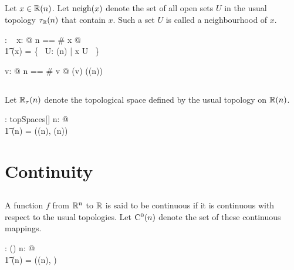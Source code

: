 \documentclass[11pt, oneside]{article}
\begin{document}
\subsection{}

Let $x \in \mathbb{R}(n)$. 
Let $\operatorname{neigh}(x)$ denote the set of all open sets $U$ in the usual topology $\tau_{\mathbb{R}}(n)$ that contain $x$.
Such a set $U$ is called a neighbourhood of $x$.

\begin{axdef}
	\neighRn: \Rinf \fun \family~\Rinf
\where
	\forall x: \Rinf @ \LET n == \# x @\\
	\t1	\neighRn(x) = \{~ U: \tauRn(n) | x \in U ~\}
\end{axdef}

\begin{remark}

\begin{zed}
	\forall v: \Rinf @ \LET n == \# v @ \neighRn(v) \in \family(\Rtuples(n))
\end{zed}

\end{remark}

\subsection{}

Let $\mathbb{R}_\tau(n)$ denote the topological space defined by the usual topology on $\mathbb{R}(n)$.

\begin{axdef}
	\RtauN: \nat \fun topSpaces[\Rinf]
\where
	\forall n: \nat @ \\
	\t1	\RtauN(n) = (\Rtuples(n), \tauRn(n))
\end{axdef}

\section{Continuity}

\subsection{}

A function $f$ from $\mathbb{R}^n$ to $\mathbb{R}$ is said to be continuous if it is continuous with respect to the usual topologies.
Let $\operatorname{C^0}(n)$ denote the set of these continuous mappings.

\begin{axdef}
	\CzeroN: \nat \fun \power(\Rinf \pfun \R)
\where
	\forall n: \nat @ \\
	\t1	\CzeroN(n) = \CzeroTT(\RtauN(n), \Rtau)
\end{axdef}
\end{document}
